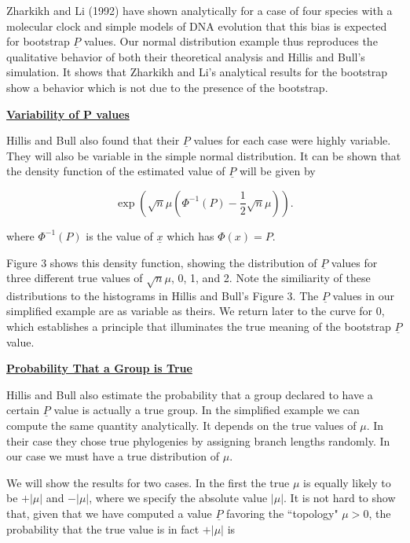{Zharkikh and Li (1992) have shown analytically for a case of four species
with a molecular clock and simple models of DNA evolution that this bias
is expected for bootstrap $\underline{P}$ values.  Our normal distribution example
thus reproduces the qualitative behavior of both their theoretical analysis
and Hillis and Bull's simulation.  It shows that Zharkikh and Li's analytical
results for the bootstrap show a behavior which is not due to the presence
of the bootstrap.
\bigskip

\centerline{\underline{\bf Variability of P values}}
\bigskip

 Hillis and Bull also found that their $\underline{P}$
values for each case were highly
variable.  They will also be variable in the simple
normal distribution.  It can be shown that the density function of the
estimated value of $\underline{P}$ will be given by
\bigskip
\bigskip

\begin{equation} %
    \exp \left(\sqrt{n}\mu \left(\Phi^{-1}(P) - \frac{1}{2}
 \sqrt{n}\mu\right)\right).
\end{equation}
\bigskip
\bigskip

\noindent
where $\Phi^{-1}(P)$ is the value of $\underline{x}$ which has $\Phi(x) = P$.

Figure 3 shows this density function, showing the distribution of $\underline{P}$
values for three different true values of $\sqrt{n}\mu$, 0, 1, and 2.  Note the
similiarity of these distributions to the histograms in Hillis and
Bull's Figure 3.  The $\underline{P}$ values in our simplified example are as
variable as theirs.   We return later to the curve for 0, which establishes
a principle that illuminates the true meaning of the bootstrap $\underline{P}$ value.
\bigskip

\centerline{\underline{\bf Probability That a Group is True}}
\bigskip

 Hillis and Bull also estimate
the probability that a group declared to
have a certain $\underline{P}$ value is actually a true group.  In the simplified
example we can compute the same quantity analytically.  It depends on
the true values of $\mu$.  In their case they chose true phylogenies by
assigning branch lengths randomly.  In our case we must have a true
distribution of $\mu$.

We will show the results for two cases.  In the
first the true $\mu$ is equally likely to be $+|\mu|$ and $-|\mu|$, where we
specify the absolute value $|\mu|$.  It is not hard to show that, given that
we have computed a value $\underline{P}$ favoring
the ``topology" $\mu > 0$, the probability that the true value is in fact
$+|\mu|$ is
\bigskip
\bigskip

}
